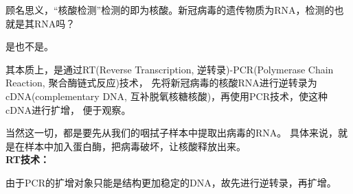 \documentclass[UTF8,a4paper,11 pt]{ctexart}
\begin{document}
	\def\GU#1{
		\edef\code{
			\unexpanded{\begin{scope}[xshift=}#1
				\unexpanded{cm, yshift=.3 cm]%
					\draw[fill=blue] (0,1.2) -- (0,0)--(.5,0)--(.5,1.2)arc (0:180:0.25);
					\node at (.25,.25) {G};
			\end{scope}}
		}\code
	}
	\def\AU#1{
		\edef\code{
			\unexpanded{\begin{scope}[xshift=}#1
				\unexpanded{cm, yshift=.3 cm]%
					\draw[fill=yellow] (0,1.2) -- (0,0)--(.5,0)--(.5,1.2) --(.25,1.45)--(0,1.2);
					\node at (.25,.25) {A};
			\end{scope}}
		}\code
	}
	\def\TU#1{
		\edef\code{
			\unexpanded{\begin{scope}[xshift=}#1
				\unexpanded{cm, yshift=.3 cm]%
					\draw[fill=green] (0,1) -- (0,0)--(.5,0)--(.5,1) --(.25,.75)--(0,1);
					\node at (.25,.25) {T};
			\end{scope}}
		}\code
	}
	\def\UU#1{
		\edef\code{
			\unexpanded{
				\begin{scope}[xshift=}#1
				\unexpanded{cm, yshift=.3 cm]%
					\draw[fill=orange] (0,1) -- (0,0)--(.5,0)--(.5,1) --(.25,.75)--(0,1);
					\node at (.25,.25) {U};
				\end{scope}
			}
		}\code
	}
	顾名思义，“核酸检测”检测的即为核酸。新冠病毒的遗传物质为RNA，检测的也就是其RNA吗？
	
	是也不是。
	
	其本质上，是通过RT(Reverse Transcription, 逆转录)-PCR(Polymerase Chain Reaction, 聚合酶链式反应)技术，
	先将新冠病毒的核酸RNA进行逆转录为cDNA(complementary DNA, 互补脱氧核糖核酸)，再使用PCR技术，使这种cDNA进行扩增，
	便于观察。
	
	当然这一切，都是要先从我们的咽拭子样本中提取出病毒的RNA。
	具体来说，就是在样本中加入蛋白酶，把病毒破坏，让核酸释放出来。
	\\\textbf{RT技术：}
	
	由于PCR的扩增对象只能是结构更加稳定的DNA，故先进行逆转录，再扩增。
	
\end{document}
